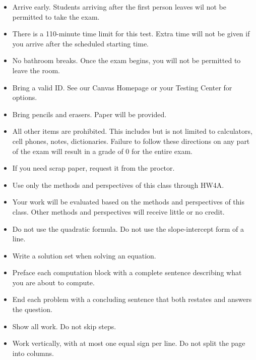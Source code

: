 \documentclass{ximera}
\begin{document}
\begin{itemize}
\item Arrive early. Students arriving after the first person leaves wil not be permitted to take the exam.

\item There is a 110-minute time limit for this test. Extra time will not be given if you arrive after the scheduled starting time.

\item No bathroom breaks. Once the exam begins, you will not be permitted to leave the room.

\item Bring a valid ID. See our Canvas Homepage or your Testing Center for options.

\item Bring pencils and erasers. Paper will be provided.

\item All other items are prohibited. This includes but is not limited to calculators, cell phones, notes, dictionaries. Failure to follow these directions on any part of the exam will result in a grade of 0 for the entire exam.

\item If you need scrap paper, request it from the proctor.

\item Use only the methods and perspectives of this class through HW4A. 

\item Your work will be evaluated based on the methods and perspectives of this class. Other methods and perspectives will receive little or no credit.

\item Do not use the quadratic formula. Do not use the slope-intercept form of a line.

\item Write a solution set when solving an equation.

\item Preface each computation block with a complete sentence describing what you are about to compute.

\item End each problem with a concluding sentence that both restates and answers the question.

\item Show all work. Do not skip steps.

\item Work vertically, with at most one equal sign per line. Do not split the page into columns.


\end{itemize}
\end{document}
